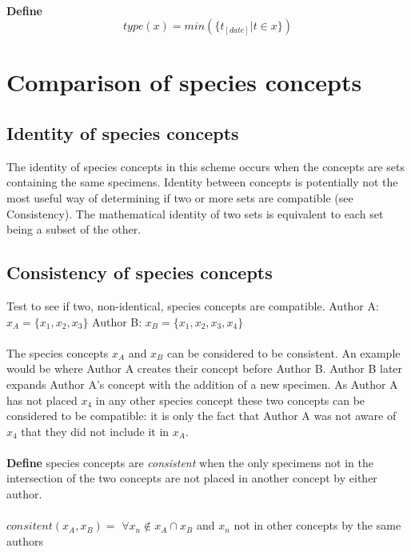 \documentclass{article}
\begin{document}
   \paragraph{}
   \textbf{Define}
   \[type(x) = min(\{t_{[date]}|t \in x\}) \]
   
   \section{Comparison of species concepts}
   \subsection{Identity of species concepts}
   The identity of species concepts in this scheme occurs when the concepts are sets containing the same specimens. Identity between concepts is potentially not the most useful way of determining if two or more sets are compatible (see Consistency). The mathematical identity of two sets is equivalent to each set being a subset of the other.

   \subsection{Consistency of species concepts}
   Test to see if two, non-identical, species concepts are compatible.
   \newline\newline
   Author A: $x_A = \{x_1, x_2, x_3\}$ \newline
   Author B: $x_B = \{x_1, x_2, x_3, x_4\}$ 
   \paragraph{}
   The species concepts $x_A$ and $x_B$ can be considered to be consistent. An example would be where Author A creates their concept before Author B. Author B later expands Author A's concept with the addition of a new specimen. As Author A has not placed $x_4$ in any other species concept these two concepts can be considered to be compatible: it is only the fact that Author A was not aware of $x_4$ that they did not include it in $x_A$.
   \paragraph{}
   \textbf{Define}  species concepts are \textit{consistent} when the only specimens not in the intersection of the two concepts are not placed in another concept by either author.
   \paragraph{}
   $consitent(x_A,x_B) =$ $\forall x_n \notin x_A \cap x_B$  and $x_n$ not in other concepts by the same authors
   
\end{document}
